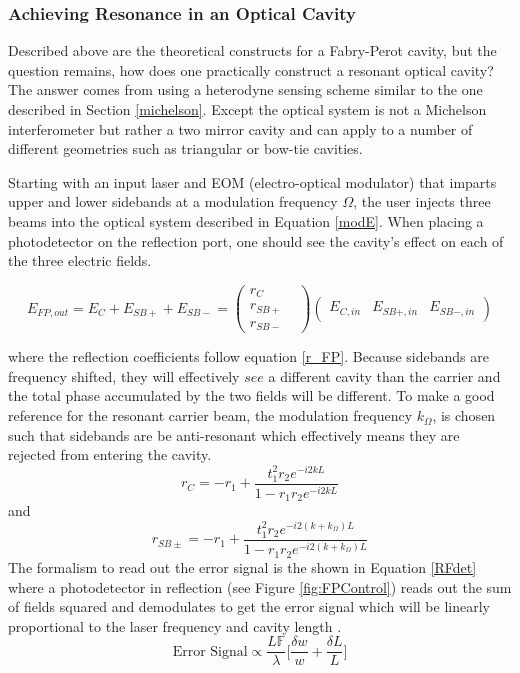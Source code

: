 		\subsubsection{Achieving Resonance in an Optical Cavity}
		Described above are the theoretical constructs for a Fabry-Perot cavity, but the question remains, how does one practically construct a resonant optical cavity?  The answer comes from using a heterodyne sensing scheme similar to the one described in Section \ref{michelson}.  Except the optical system is not a Michelson interferometer but rather a two mirror cavity and can apply to a number of different geometries such as triangular or bow-tie cavities.
		
		Starting with an input laser and EOM (electro-optical modulator) that imparts upper and lower sidebands at a modulation frequency $\Omega$, the user injects three beams into the optical system described in Equation \ref{modE}.  When placing a photodetector on the reflection port, one should see the cavity's effect on each of the three electric fields.
		
		\begin{equation}
		E_{FP,out} = E_{C} + E_{SB+} + E_{SB-} = 
		\begin{pmatrix}
		r_{C} 	&   
		\\ 	r_{SB+} &
		\\ 	r_{SB-} &
		\end{pmatrix}
		\begin{pmatrix}
		E_{C,in} &    E_{SB+,in}    &  E_{SB-,in}     
		\end{pmatrix}
		\end{equation}
		
		where the reflection coefficients follow equation \ref{r_FP}.  Because sidebands are frequency shifted, they will effectively $see$ a different cavity than the carrier and the total phase accumulated by the two fields will be different. To make a good reference for the resonant carrier beam, the modulation frequency $k_{\Omega}$, is chosen such that sidebands are be anti-resonant which effectively means they are rejected from entering the cavity.
		\begin{equation}
		r_{C} = -r_1 + \frac{t_1^2 r_2  e^{-i2kL}}{1-r_1 r_2 e^{-i2kL}}
		\end{equation}
		and 
		\begin{equation}
		r_{SB\pm} = -r_1 + \frac{t_1^2 r_2  e^{-i2(k+k_{\Omega})L}}{1-r_1 r_2 e^{-i2(k+k_{\Omega})L}}
		\end{equation}
		The formalism to read out the error signal is the shown in Equation \ref{RFdet} where a photodetector in reflection (see Figure \ref{fig:FPControl}) reads out the sum of fields squared and demodulates to get the error signal which will be linearly proportional to the laser frequency and cavity length \cite{BlackPDH}.
		\begin{equation}
		\text{Error Signal} \propto \frac{L \mathbb{F}}{\lambda} \bigg[\frac{\delta w}{w} + \frac{\delta L}{L}\bigg]
		\end{equation}
		
